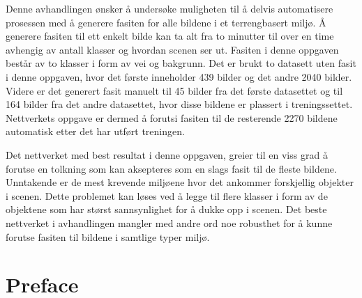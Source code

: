 \documentclass[USenglish]{ifimaster}  %
\begin{document}
Denne avhandlingen ønsker å undersøke muligheten til å delvis automatisere prosessen med å generere fasiten for alle bildene i et terrengbasert miljø. Å generere fasiten til ett enkelt bilde kan ta alt fra to minutter til over en time avhengig av antall klasser og hvordan scenen ser ut. Fasiten i denne oppgaven består av to klasser i form av vei og bakgrunn. Det er brukt to datasett uten fasit i denne oppgaven, hvor det første inneholder 439 bilder og det andre 2040 bilder. Videre er det generert fasit manuelt til 45 bilder fra det første datasettet og til 164 bilder fra det andre datasettet, hvor disse bildene er plassert i treningssettet. Nettverkets oppgave er dermed å forutsi fasiten til de resterende 2270 bildene automatisk etter det har utført treningen.   

Det nettverket med best resultat i denne oppgaven, greier til en viss grad å forutse en tolkning som kan aksepteres som en slags fasit til de fleste bildene. Unntakende er de mest krevende miljøene hvor det ankommer forskjellig objekter i scenen. Dette problemet kan løses ved å legge til flere klasser i form av de objektene som har størst sannsynlighet for å dukke opp i scenen. Det beste nettverket i avhandlingen mangler med andre ord noe robusthet for å kunne forutse fasiten til bildene i samtlige typer miljø. 

\chapter*{Preface}


\tableofcontents{}
\listoffigures{}
\listoftables{}
\end{document}
